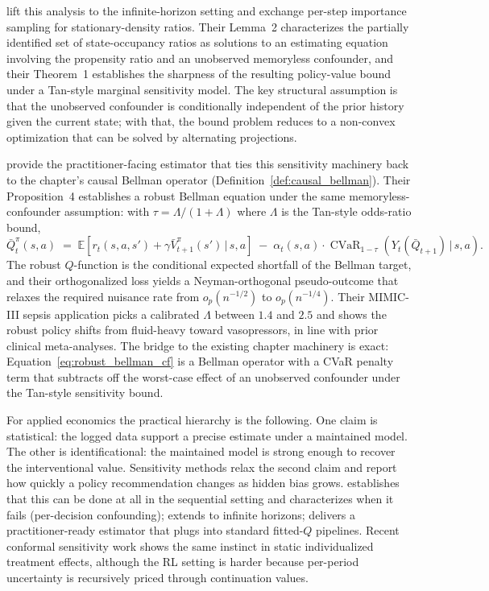 \citet{kallus2020confounding} lift this analysis to the infinite-horizon setting and exchange per-step importance sampling for stationary-density ratios. Their Lemma~2 characterizes the partially identified set of state-occupancy ratios as solutions to an estimating equation involving the propensity ratio and an unobserved memoryless confounder, and their Theorem~1 establishes the sharpness of the resulting policy-value bound under a Tan-style marginal sensitivity model. The key structural assumption is that the unobserved confounder is conditionally independent of the prior history given the current state; with that, the bound problem reduces to a non-convex optimization that can be solved by alternating projections.

\citet{brunsSmith2021modelFree} provide the practitioner-facing estimator that ties this sensitivity machinery back to the chapter's causal Bellman operator (Definition~\ref{def:causal_bellman}). Their Proposition~4 establishes a robust Bellman equation under the same memoryless-confounder assumption: with $\tau = \Lambda / (1 + \Lambda)$ where $\Lambda$ is the Tan-style odds-ratio bound,
\begin{equation}
\bar Q_t^\pi(s, a) \;=\; \mathbb{E}\!\left[r_t(s, a, s') + \gamma \bar V_{t+1}^\pi(s') \,\big|\, s, a\right]
\;-\; \alpha_t(s,a) \cdot \operatorname{CVaR}_{1-\tau}\!\left(Y_t(\bar Q_{t+1}) \,\big|\, s, a\right).
\label{eq:robust_bellman_cf}
\end{equation}
The robust $Q$-function is the conditional expected shortfall of the Bellman target, and their orthogonalized loss yields a Neyman-orthogonal pseudo-outcome that relaxes the required nuisance rate from $o_p(n^{-1/2})$ to $o_p(n^{-1/4})$. Their MIMIC-III sepsis application picks a calibrated $\Lambda$ between $1.4$ and $2.5$ and shows the robust policy shifts from fluid-heavy toward vasopressors, in line with prior clinical meta-analyses. The bridge to the existing chapter machinery is exact: Equation~\eqref{eq:robust_bellman_cf} is a Bellman operator with a CVaR penalty term that subtracts off the worst-case effect of an unobserved confounder under the Tan-style sensitivity bound.

For applied economics the practical hierarchy is the following. One claim is statistical: the logged data support a precise estimate under a maintained model. The other is identificational: the maintained model is strong enough to recover the interventional value. Sensitivity methods relax the second claim and report how quickly a policy recommendation changes as hidden bias grows. \citet{namkoong2020off} establishes that this can be done at all in the sequential setting and characterizes when it fails (per-decision confounding); \citet{kallus2020confounding} extends to infinite horizons; \citet{brunsSmith2021modelFree} delivers a practitioner-ready estimator that plugs into standard fitted-$Q$ pipelines. Recent conformal sensitivity work \citep{yinShiWangBlei2024conformalSensitivity} shows the same instinct in static individualized treatment effects, although the RL setting is harder because per-period uncertainty is recursively priced through continuation values.

